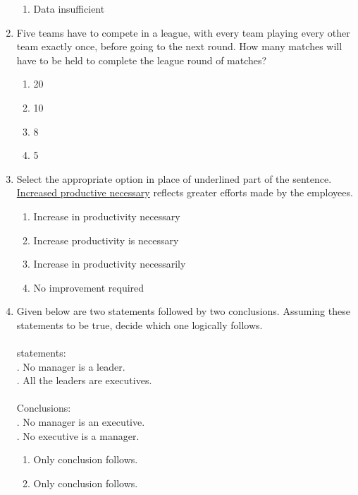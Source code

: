 \documentclass[journal,12pt,onecolumn]{IEEEtran}
\theoremstyle{remark}
\begin{document}
\begin{enumerate}
\begin{enumerate}
        \item Data insufficient
    \end{enumerate}
    \item Five teams have to compete in a league, with every team playing every other team exactly once, before going to the next round. How many matches will have to be held to complete the league round of matches?
    \begin{enumerate}
        \item 20
        \item 10
        \item 8
        \item 5
    \end{enumerate}
    \item Select the appropriate option in place of underlined part of the sentence.\\ \underline{Increased productive necessary} reflects greater efforts made by the employees.
    \begin{enumerate}
        \item Increase in productivity necessary
        \item Increase productivity is necessary
        \item Increase in productivity necessarily
        \item No improvement required
    \end{enumerate}
    \item Given below are two statements followed by two conclusions. Assuming these statements to be true, decide which one logically follows.\\\\
    statements:\\
    \uppercase{\expandafter{}}. No manager is a leader.\\
    \uppercase{\expandafter{}}. All the leaders are executives.\\\\
    Conclusions:\\
    \uppercase{\expandafter{}}. No manager is an executive.\\
    \uppercase{\expandafter{}}. No executive is a manager.\\
    \begin{enumerate}
        \item Only conclusion \uppercase{\expandafter{}} follows.
        \item Only conclusion \uppercase{\expandafter{}} follows.

\end{enumerate}
\end{enumerate}
\end{document}
